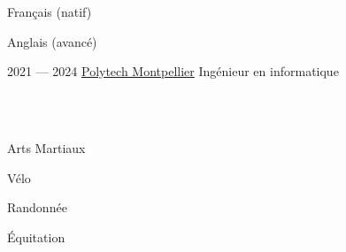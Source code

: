 \begin{SideBar}{\ColorBackground}{\ColorTextSide}

  \begin{ItemList}{\ColorHighlight}
    \item[\ding{226}]Français (natif)
    \item[\ding{226}]Anglais (avancé)
  \end{ItemList}
  \vspace{1cm}

  \ExperienceSmallTwo%
  {2021 --- 2024}%
  {\href{https://polytech.umontpellier.fr/}{Polytech Montpellier}}%
  {Ingénieur en informatique}%
  \vspace{1cm}

  \vspace{\baselineskip}

  \\
  \vspace{0.25cm}
  \\
  \vspace{0.25cm}
  \vspace{1cm}

  \begin{ItemList}{\ColorHighlight}
    \item Arts Martiaux
    \item Vélo
    \item Randonnée
    \item Équitation
  \end{ItemList}
\end{SideBar}